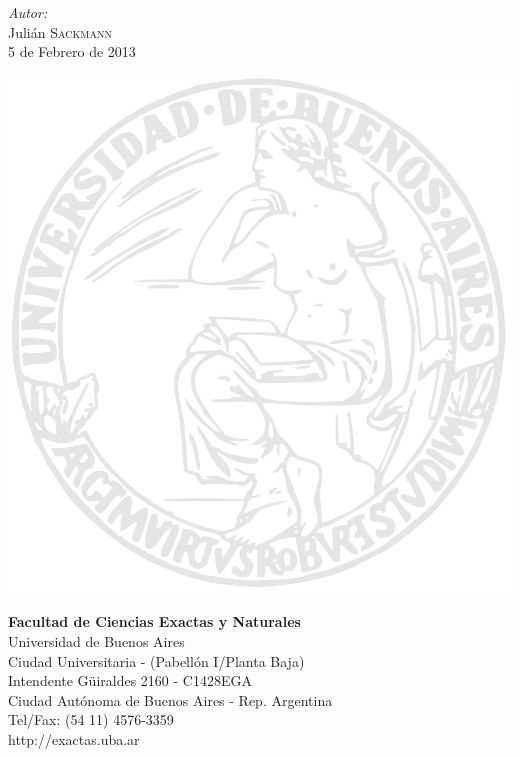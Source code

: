\documentclass[]{article}
\begin{document}
\begin{titlepage}
\Large \emph{Autor:}\\
Julián \textsc{Sackmann}\\[2cm] %


{\large 5 de Febrero de 2013}\\[2cm] %


\begin{minipage}[t]{\textwidth}
    \begin{minipage}[t]{.55 \textwidth}
        \includegraphics{logo_uba.jpg}
    \end{minipage}%
    \begin{minipage}[b]{.45 \textwidth}
        \textbf{\textsf{Facultad de Ciencias Exactas y Naturales}} \\
        \textsf{Universidad de Buenos Aires} \\
        {\scriptsize %
        Ciudad Universitaria - (Pabell\'on I/Planta Baja) \\
            Intendente G\"uiraldes 2160 - C1428EGA \\
        Ciudad Aut\'onoma de Buenos Aires - Rep. Argentina \\
            Tel/Fax: (54 11) 4576-3359 \\
        http://exactas.uba.ar \\
        }
    \end{minipage}
\end{minipage}%


\end{titlepage}
\end{document}
